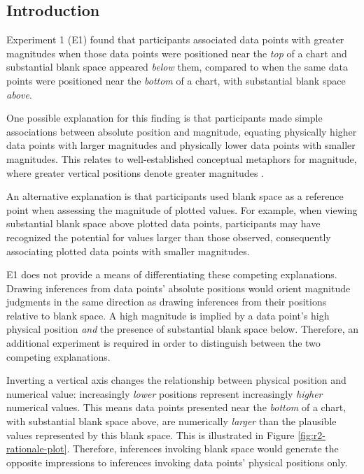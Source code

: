 \documentclass[journal]{vgtc}                %
\begin{document}
\hypertarget{introduction-1}{%
\subsection{Introduction}\label{introduction-1}}

Experiment 1 (E1) found that participants associated data points with
greater magnitudes when those data points were positioned near the \emph{top}
of a chart and substantial blank space appeared \emph{below} them, compared
to when the same data points were positioned near the \emph{bottom} of a
chart, with substantial blank space \emph{above}.

One possible explanation for this finding is that participants made
simple associations between absolute position and magnitude, equating
physically higher data points with larger magnitudes and physically
lower data points with smaller magnitudes. This relates to
well-established conceptual metaphors for magnitude, where greater
vertical positions denote greater magnitudes \citep{tversky_cognitive_1997}.

An alternative explanation is that participants used blank space as a
reference point when assessing the magnitude of plotted values. For
example, when viewing substantial blank space above plotted data points,
participants may have recognized the potential for values larger than
those observed, consequently associating plotted data points with
smaller magnitudes.

E1 does not provide a means of differentiating these competing
explanations. Drawing inferences from data points' absolute positions
would orient magnitude judgments in the same direction as drawing
inferences from their positions relative to blank space. A high
magnitude is implied by a data point's high physical position \emph{and} the
presence of substantial blank space below. Therefore, an additional
experiment is required in order to distinguish between the two competing
explanations.~

Inverting a vertical axis changes the relationship between physical
position and numerical value: increasingly \emph{lower} positions represent
increasingly \emph{higher} numerical values. This means data points presented
near the \emph{bottom} of a chart, with substantial blank space above, are
numerically \emph{larger} than the plausible values represented by this blank
space. This is illustrated in Figure \ref{fig:r2-rationale-plot}.
Therefore, inferences invoking blank space would generate the opposite
impressions to inferences invoking data points' physical positions only.
\end{document}
